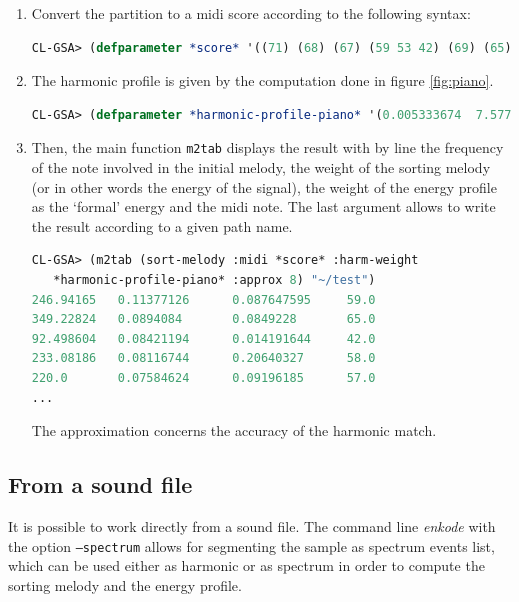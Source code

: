 \begin{enumerate}
\item 
Convert the partition to a midi score according to the following syntax:
\begin{lstlisting}[language=Lisp]
CL-GSA> (defparameter *score* '((71) (68) (67) (59 53 42) (69) (65) (65) (61 57 46) (64) (60 64) (58) (67 59 50 42) (54) (57) (58) (59)))
\end{lstlisting}

\item
The harmonic profile is given by the computation done in figure \ref{fig:piano}.

\begin{lstlisting}[language=Lisp]
CL-GSA> (defparameter *harmonic-profile-piano* '(0.005333674  7.5771334e-4  0.0011644672 1.3338796e-4 7.3244237e-6  7.2097446e-6  2.3828345e-6  4.374403e-6 4.064216e-6  1.18368014e-4  4.6414575e-6  5.292382e-6 2.4746847e-5))
\end{lstlisting}

\item
Then, the main function \texttt{m2tab} displays the result with by line the frequency of the note involved in the initial melody, the weight of the sorting melody (or in other words the energy of the signal), the weight of the energy profile as the `formal' energy and the midi note. The last argument allows to write the result according to a given path name.   

\begin{lstlisting}[language=Lisp]
CL-GSA> (m2tab (sort-melody :midi *score* :harm-weight
   *harmonic-profile-piano* :approx 8) "~/test")
246.94165   0.11377126      0.087647595     59.0
349.22824   0.0894084       0.0849228       65.0
92.498604   0.08421194      0.014191644     42.0
233.08186   0.08116744      0.20640327      58.0
220.0       0.07584624      0.09196185      57.0
...
\end{lstlisting}

The approximation concerns the accuracy of the harmonic match.
\end{enumerate}

\subsection{From a sound file}

It is possible to work directly from a sound file. The command line \textsl{enkode} with the option \texttt{--spectrum} allows for segmenting the sample as spectrum events list, which can be used either as harmonic or as spectrum in order to compute the sorting melody and the energy profile. 

